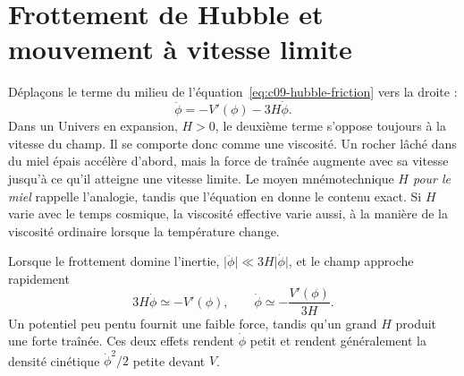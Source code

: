 \begin{classroomqa}
\end{classroomqa}

\section{Frottement de Hubble et mouvement à vitesse limite}

Déplaçons le terme du milieu de l’équation~\eqref{eq:c09-hubble-friction} vers la droite :
\begin{equation}
\ddot\phi=-V'(\phi)-3H\dot\phi.
\end{equation}
Dans un Univers en expansion, \(H>0\), le deuxième terme s’oppose toujours à la vitesse du champ. Il se comporte donc comme une viscosité. Un rocher lâché dans du miel épais accélère d’abord, mais la force de traînée augmente avec sa vitesse jusqu’à ce qu’il atteigne une vitesse limite. Le moyen mnémotechnique \emph{\(H\) pour le miel} rappelle l’analogie, tandis que l’équation en donne le contenu exact. Si \(H\) varie avec le temps cosmique, la viscosité effective varie aussi, à la manière de la viscosité ordinaire lorsque la température change.

Lorsque le frottement domine l’inertie, \(\lvert\ddot\phi\rvert\ll3H\lvert\dot\phi\rvert\), et le champ approche rapidement
\begin{equation}
3H\dot\phi\simeq -V'(\phi),
\qquad
\dot\phi\simeq-\frac{V'(\phi)}{3H}.
\label{eq:c09-terminal}
\end{equation}
Un potentiel peu pentu fournit une faible force, tandis qu’un grand \(H\) produit une forte traînée. Ces deux effets rendent \(\dot\phi\) petit et rendent généralement la densité cinétique \(\dot\phi^2/2\) petite devant \(V\).

\begin{classroomqa}
\end{classroomqa}

